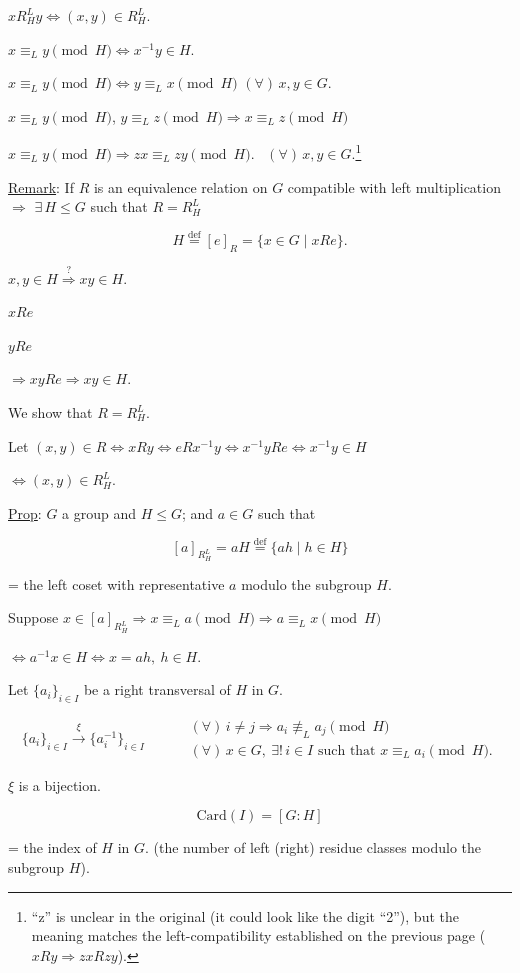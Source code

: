 \documentclass[12pt]{article}
\begin{document}
\noindent $xR_H^L y \Leftrightarrow (x,y)\in R_H^L$.

\noindent $x\equiv_L y \pmod H \Leftrightarrow x^{-1}y\in H$.

\bigskip
\noindent $x\equiv_L y \pmod H \Leftrightarrow y\equiv_L x \pmod H$ $(\forall)\, x,y\in G$.

\noindent $x\equiv_L y \pmod H$, $y\equiv_L z \pmod H \Rightarrow x\equiv_L z \pmod H$

\bigskip
\noindent $x\equiv_L y \pmod H \Rightarrow zx\equiv_L zy \pmod H$. \ $(\forall)\, x,y\in G$.\footnote{``z'' is unclear in the original (it could look like the digit ``2''), but the meaning matches the left-compatibility established on the previous page ($xRy\Rightarrow zxRzy$).}

\bigskip
\noindent\underline{Remark}: If $R$ is an equivalence relation on $G$ compatible with left multiplication $\Rightarrow$ $\exists\, H\leq G$ such that $R=R_H^L$

\[
H \overset{\text{def}}{=} [e]_R = \{x\in G \mid xRe\}.
\]

\noindent $x,y\in H \overset{?}{\Rightarrow} xy\in H$.

\noindent $xRe$

\noindent $yRe$

\noindent $\Rightarrow xyRe \Rightarrow xy\in H$.

\bigskip
\noindent We show that $R=R_H^L$.

\noindent Let $(x,y)\in R \Leftrightarrow xRy \Leftrightarrow eRx^{-1}y \Leftrightarrow x^{-1}yRe \Leftrightarrow x^{-1}y\in H$

\noindent $\Leftrightarrow (x,y)\in R_H^L$.

\bigskip
\noindent\underline{Prop}: $G$ a group and $H\leq G$; and $a\in G$ such that

\[
[a]_{R_H^L} = aH \overset{\text{def}}{=} \{ah \mid h\in H\}
\]

\noindent = the left coset with representative $a$ modulo the subgroup $H$.

\bigskip
\noindent Suppose $x\in[a]_{R_H^L} \Rightarrow x\equiv_L a \pmod H \Rightarrow a\equiv_L x \pmod H$

\noindent $\Leftrightarrow a^{-1}x\in H \Leftrightarrow x=ah,\ h\in H$.

\bigskip
\noindent Let $\{a_i\}_{i\in I}$ be a right transversal of $H$ in $G$.

\[
\{a_i\}_{i\in I} \xrightarrow{\ \xi\ } \{a_i^{-1}\}_{i\in I} \qquad
\begin{aligned}
&(\forall)\, i\neq j \Rightarrow a_i \not\equiv_L a_j \pmod H\\
&(\forall)\, x\in G,\ \exists!\, i\in I \text{ such that } x\equiv_L a_i \pmod H.
\end{aligned}
\]

\noindent $\xi$ is a bijection.

\[
\text{Card}(I) = [G:H]
\]

\noindent = the index of $H$ in $G$. (the number of left (right) residue classes modulo the subgroup $H$).
\end{document}
